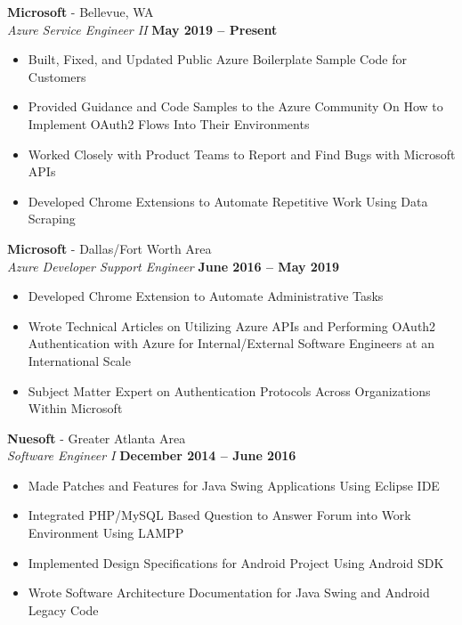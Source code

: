 \documentclass[margin,line]{resume}
\begin{document}
\begin{resume}
	\textbf{Microsoft} - Bellevue, WA \vspace{1mm}\\\vspace{1mm}
	\textsl{Azure Service Engineer II} \hfill \textbf{May 2019 -- Present}
	\begin{itemize}
		\item Built, Fixed, and Updated Public Azure Boilerplate Sample Code for Customers
		\item Provided Guidance and Code Samples to the Azure Community On How to Implement OAuth2 Flows Into Their Environments
		\item Worked Closely with Product Teams to Report and Find Bugs with Microsoft APIs
		\item Developed Chrome Extensions to Automate Repetitive Work Using Data Scraping
	\end{itemize}
		
	\textbf{Microsoft} - Dallas/Fort Worth Area\vspace{1mm}\\\vspace{1mm}
	\textsl{Azure Developer Support Engineer} \hfill \textbf{June 2016 -- May 2019}
	\begin{itemize}
		 \item Developed Chrome Extension to Automate Administrative Tasks
		 \item Wrote Technical Articles on Utilizing Azure APIs and Performing OAuth2 Authentication with Azure for Internal/External Software Engineers at an International Scale
		 \item Subject Matter Expert on Authentication Protocols Across Organizations Within Microsoft
	
	\end{itemize}

	\textbf{Nuesoft} - Greater Atlanta Area \vspace{1mm}\\\vspace{1mm}%
	\textsl{Software Engineer I} \hfill \textbf{December 2014 -- June 2016}
	\begin{itemize}
	 	\item Made Patches and Features for Java Swing Applications Using Eclipse IDE 
	 	\item Integrated PHP/MySQL Based Question to Answer Forum into Work Environment Using LAMPP
	 	\item Implemented Design Specifications for Android Project Using Android SDK
	 	\item Wrote Software Architecture Documentation for Java Swing and Android Legacy Code 
	\end{itemize}


\end{resume}
\end{document}
